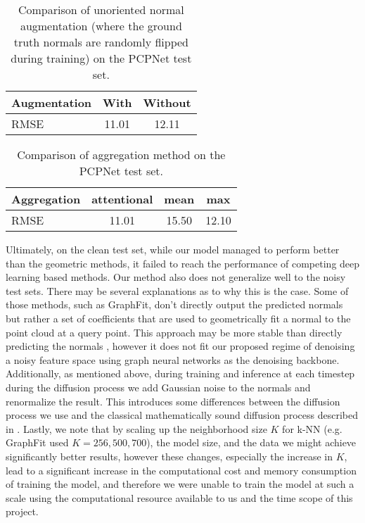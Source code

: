 \documentclass{acmart}
\begin{document}
\begin{table}[ht]
  \centering
  \caption{Comparison of unoriented normal augmentation (where the ground truth normals are randomly flipped during training) on the PCPNet test set.}
  \label{tab:augmentation_comparison}
  \begin{tabular}{lcc}
  \hline
  \textbf{Augmentation} & \textbf{With} & \textbf{Without} \\ \hline
  RMSE & 11.01 & 12.11 \\ \hline
  \end{tabular}
  \end{table}
\begin{table}[ht]
  \centering
  \caption{Comparison of aggregation method on the PCPNet test set.}
  \label{tab:aggregation_comparison}
  \begin{tabular}{lccc}
  \hline
  \textbf{Aggregation} & \textbf{attentional} & \textbf{mean} & \textbf{max} \\ \hline
  RMSE & 11.01 & 15.50 & 12.10 \\ \hline
  \end{tabular}
  \end{table}
Ultimately, on the clean test set, while our model managed to perform better than the geometric methods, it failed to reach the performance of competing deep learning based methods. Our method also does not generalize well to the noisy test sets. There may be several explanations as to why this is the case. Some of those methods, such as GraphFit, don't directly output the predicted normals but rather a set of coefficients that are used to geometrically fit a normal to the point cloud at a query point. This approach may be more stable than directly predicting the normals \cite{zhu2021adafit}, however it does not fit our proposed regime of denoising a noisy feature space using graph neural networks as the denoising backbone. Additionally, as mentioned above, during training and inference at each timestep during the diffusion process we add Gaussian noise to the normals and renormalize the result. This introduces some differences between the diffusion process we use and the classical mathematically sound diffusion process described in \cite{ho2020denoising}.
Lastly, we note that by scaling up the neighborhood size $K$ for k-NN (e.g. GraphFit used $K=256,500,700$), the model size, and the data we might achieve significantly better results, however these changes, especially the increase in $K$, lead to a significant increase in the computational cost and memory consumption of training the model, and therefore we were unable to train the model at such a scale using the computational resource available to us and the time scope of this project.
\end{document}
